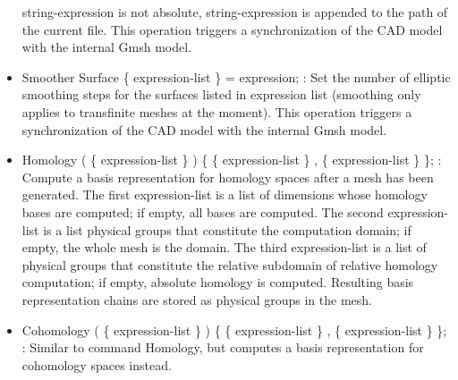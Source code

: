 \documentclass[dvipdfmx, 9pt, a4paper]{article}
\numberwithin{equation}{section}
\begin{document}
\begin{itemize}
string-expression is not absolute, string-expression is appended to the path of the current file. This operation triggers a synchronization of the CAD model with the internal Gmsh model.
\item Smoother Surface \{ expression-list \} = expression; : Set the number of elliptic smoothing steps for the surfaces listed in expression list (smoothing only applies to transfinite meshes at the moment). This operation triggers a synchronization of the CAD model with the internal Gmsh model.
\item Homology ( \{ expression-list \} ) \{ \{ expression-list \} , \{ expression-list \} \}; : Compute a basis representation for homology spaces after a mesh has been generated. The first expression-list is a list of dimensions whose homology bases are computed; if empty, all bases are computed. The second expression-list is a list physical groups that constitute the computation domain; if empty, the whole mesh
is the domain. The third expression-list is a list of physical groups that constitute the relative subdomain of relative homology computation; if empty, absolute homology is computed. Resulting basis representation chains are stored as physical groups in the mesh.
\item Cohomology ( \{ expression-list \} ) \{ \{ expression-list \} , \{ expression-list \} \}; : Similar to command Homology, but computes a basis representation for cohomology spaces instead.
\end{itemize}
\end{document}
